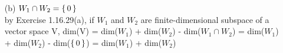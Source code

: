 \begin{tcolorbox}
\begin{solution}
\begin{enumerate}
			
			\item[(b)] $W_1 \cap W_2 = \left\{ \,0 \,\right\}$\\
			by Exercise 1.16.29(a), if $W_1$ and $W_2$ are finite-dimensional subspace of a vector space V, dim(V) = dim($W_1$) + dim($W_2$) - dim($W_1 \cap W_2$) = dim($W_1$) + dim($W_2$) - dim($\left\{ \,0 \,\right\}$) = dim($W_1$) + dim($W_2$)
		\end{enumerate}
	\end{solution}
\end{tcolorbox}